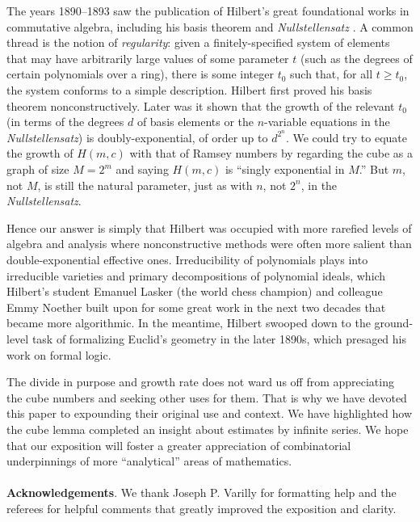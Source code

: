 \documentclass{article}
\theoremstyle{plain}
\theoremstyle{definition}
\renewcommand{\geq}{\geqslant}  %
\begin{document}
The years 1890--1893 saw the publication of Hilbert's great
foundational works in commutative algebra, including his basis theorem
and \textit{Nullstellensatz} \cite{Hilbert1890,Hilbert1893}. A common
thread is the notion of \emph{regularity}: given
a finitely-specified system of elements that may have arbitrarily
large values of some parameter $t$ (such as the degrees of certain polynomials
over a ring), there is some integer $t_0$ such that, for all 
$t \geq t_0$, the system conforms to a simple description. Hilbert
first proved his basis theorem nonconstructively. Later was it shown
that the growth of the relevant $t_0$ (in terms of the degrees $d$ of
basis elements or the $n$-variable equations in the
\textit{Nullstellensatz}) is doubly-exponential, of order up to
$d^{2^n}$.  We could try to equate the growth of $H(m,c)$ with 
that of Ramsey numbers by regarding the cube as a graph of size $M = 2^m$ and saying
$H(m,c)$ is ``singly exponential in $M$.'' But $m$, not $M$, is still the
natural parameter, just as with $n$, not $2^n$, in the \textit{Nullstellensatz}.


Hence our answer is simply that Hilbert was occupied with
more rarefied levels of algebra and analysis where nonconstructive methods were often more salient
than double-exponential effective ones. Irreducibility of polynomials plays into irreducible
varieties and primary decompositions of polynomial ideals, which
Hilbert's student Emanuel Lasker (the world chess champion) and
colleague 
Emmy Noether built upon for some great work in the next
two decades that became more algorithmic. 
%
%
In the meantime, Hilbert swooped down to the
ground-level task of formalizing Euclid's geometry in the later 1890s,
which presaged his work on formal logic.

The divide in purpose and growth rate does not ward us off from
appreciating the cube numbers and seeking other uses for them. That is
why we have devoted this paper to expounding their original use and
context. We have highlighted how the cube lemma completed an insight
about estimates by infinite series. We hope that our exposition will
foster a greater appreciation of combinatorial underpinnings of more
``analytical'' areas of mathematics.
\\
\\
\textbf{Acknowledgements}.
We thank Joseph P. Varilly for formatting help and the referees for helpful comments that greatly improved the exposition and clarity.
\end{document}
